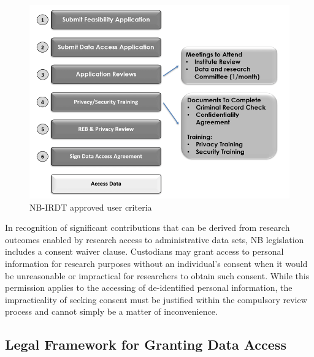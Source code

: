 \documentclass[
]{WileySix}
\begin{document}
\begin{figure}
\includegraphics[width=1\linewidth]{./assets/nbirdt/nbirdtfigure2web} \caption{NB-IRDT approved user criteria}\label{fig:nbirdtfigure2}
\end{figure}

In recognition of significant contributions that can be derived from research outcomes enabled by research access to administrative data sets, NB legislation includes a consent waiver clause. Custodians may grant access to personal information for research purposes without an individual's consent when it would be unreasonable or impractical for researchers to obtain such consent. While this permission applies to the accessing of de-identified personal information, the impracticality of seeking consent must be justified within the compulsory review process and cannot simply be a matter of inconvenience.

\hypertarget{legal-framework-for-granting-data-access-2}{%
\subsection{Legal Framework for Granting Data Access}\label{legal-framework-for-granting-data-access-2}}
\end{document}
